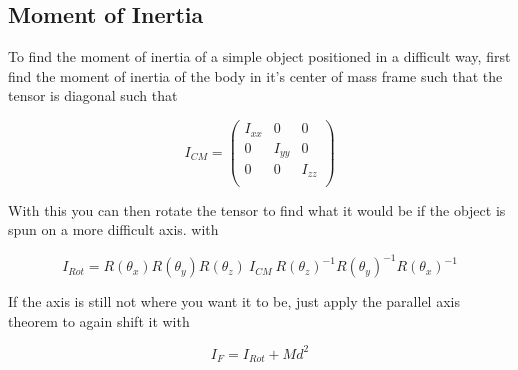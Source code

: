 \subsection{Moment of Inertia}
To find the moment of inertia of a simple object positioned in a difficult way, first find the moment of inertia of the body in it's center of mass frame such that the tensor is diagonal such that 

$$ I_{CM} = 
\left(
{\begin{array}{ccc}
I_{xx}&0&0\\
0&I_{yy}&0\\
0&0&I_{zz}\\
\end{array}}
\right)$$

With this you can then rotate the tensor to find what it would be if the object is spun on a more difficult axis. with 

$$I_{Rot} = R(\theta_x)R(\theta_y)R(\theta_z)~I_{CM}~R(\theta_z)^{-1}R(\theta_y)^{-1}R(\theta_x)^{-1}$$

If the axis is still not where you want it to be, just apply the parallel axis theorem to again shift it with

$$I_{F} = I_{Rot} + Md^2$$





